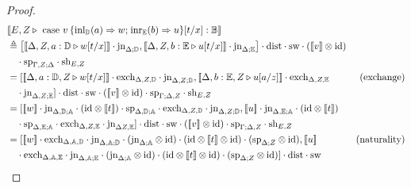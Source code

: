 \documentclass[10pt,a4paper]{amsart}
\theoremstyle{definition}
\theoremstyle{definition}
\theoremstyle{definition}
\theoremstyle{definition}
\theoremstyle{definition}
\theoremstyle{definition}
\begin{document}
\begin{proof}
\begin{align*}
  &[\![E, Z \vljud \text{ case } v  \hspace{2pt}  \{\text{inl}_{\typeD} (a) \Rightarrow w ; \hspace{1pt} \text{inr}_{\typeE} (b) \Rightarrow u\} [t/x]: \typeB]\!] \\
  & \triangleq  \left[[\![ \Delta  , Z ,  a:\typeD \vljud w[t/x] ]\!] \cdot \text{jn}_{ \Delta;\typeD},[\![ \Delta, Z, b:\typeE \vljud u[t/x]  ]\!] \cdot \text{jn}_{ \Delta;\typeE}\right] \cdot \text{dist} \cdot \text{sw} \cdot ([\![ v ]\!]   \otimes \text{id})  \\
  &  \hspace{10pt}  \cdot \text{sp}_{\Gamma, Z;\Delta} \cdot \text{sh}_{E,Z} \hspace{10pt} \\
  & =   [[\![ \Delta ,  a:\typeD , Z \vljud  w [t/x]  ]\!] \cdot \text{exch}_{\Delta,Z,\typeD} \cdot \text{jn}_{\Delta, Z; \typeD},[\![  \Delta ,  b:\typeE , Z \vljud u [a/z]   ]\!] \cdot \text{exch}_{\Delta, Z,\typeE}   & {(\text{exchange})} \\
  & \hspace{10pt} \cdot \text{jn}_{\Delta, Z; \typeE} ] \cdot \text{dist} \cdot \text{sw} \cdot ([\![v]\!] \otimes \text{id})  \cdot \text{sp}_{\Gamma; \Delta, Z} \cdot \text{sh}_{E,Z}    \\
  & =  [[\![ w ]\!]  \cdot \text{jn}_{\Delta,\typeD; \typeA} \cdot (\text{id} \otimes [\![t]\!] ) \cdot \text{sp}_{\Delta,\typeD; \typeA} \cdot  \text{exch}_{\Delta, Z,\typeD} \cdot \text{jn}_{\Delta, Z; \typeD} , [\![ u ]\!]\cdot \text{jn}_{\Delta,\typeE; \typeA} \cdot (\text{id} \otimes [\![ t]\!] )     \\
  & \hspace{10pt} \cdot \text{sp}_{\Delta,\typeE; \typeA}  \cdot \text{exch}_{\Delta, Z,\typeE} \cdot\text{jn}_{\Delta Z, \typeE} ]\cdot \text{dist} \cdot \text{sw} \cdot ([\![v]\!] \otimes \text{id})  \cdot \text{sp}_{\Gamma; \Delta, Z} \cdot \text{sh}_{E,Z} \\
  & = [[\![ w ]\!] \cdot \text{exch}_{\Delta, \typeA,\typeD} \cdot \text{jn}_{\Delta, \typeA; \typeD} \cdot (\text{jn}_{\Delta; \typeA} \otimes \text{id}) \cdot (\text{id} \otimes [\![t]\!]  \otimes \text{id}) \cdot  (\text{sp}_{\Delta; Z} \otimes \text{id}),  [\![ u ]\!]  & {(\text{naturality})} \\
  & \hspace{10pt} \cdot \text{exch}_{\Delta, \typeA,\typeE} \cdot \text{jn}_{\Delta, \typeA; \typeE} \cdot (\text{jn}_{\Delta; \typeA} \otimes \text{id}) \cdot (\text{id} \otimes [\![t]\!]  \otimes \text{id}) \cdot  (\text{sp}_{\Delta; Z} \otimes \text{id}) ] \cdot \text{dist} \cdot \text{sw}  \\

\end{align*}
\end{proof}
\end{document}
